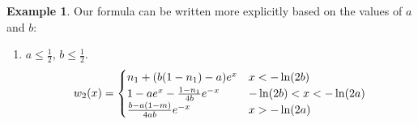 \documentclass[11pt]{article}
\theoremstyle{definition}
\newtheorem{ex}[thm]{Example}
\numberwithin{equation}{section}
\numberwithin{thm}{section}
\renewcommand{\a}{a}
\renewcommand{\b}{b}
\newcommand{\m}{n_1}
\begin{document}
\begin{ex}
%
%
%
%
%
%
%
%
%
%
%
%

Our formula can be written more explicitly based on the values of $\a$ and $\b$:
\begin{enumerate}[{Case} 1.]

\item $\a\leq\frac{1}{2}$, $\b\leq\frac{1}{2}$.
\begin{equation}
w_2(x) = \begin{cases}
\m + (\Conecaseone) e^x  & x < -\ln(2\b) \\
1 - \Ctwocaseone e^x - \Cthreecaseone e^{-x} & -\ln(2\b) < x < -\ln(2\a) \\
\Cfourcaseone e^{-x} & x > -\ln(2\a)
\end{cases}
\end{equation}


\end{enumerate}
\end{ex}
\end{document}
